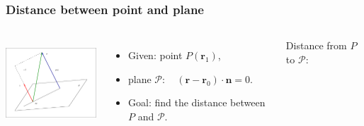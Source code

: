 \begin{frame}
  \frametitle{Distance between point and plane}
  \begin{columns}
  
          \includegraphics[height=1.3in]{../../modules/vectors/pictures/ok-distance_point_plane.eps}
\begin{itemize}
\item Given: point $P(\textbf{r}_1)$,
\item plane $\mathcal{P}: \quad (\textbf{r}-\textbf{r}_0)\cdot \textbf{n} = 0$.
\item Goal: find the distance between $P$ and $\mathcal P$. 
\end{itemize}
\alert<1->{Distance} from $P$ to $\mathcal{P}$:

\end{columns}
\end{frame}